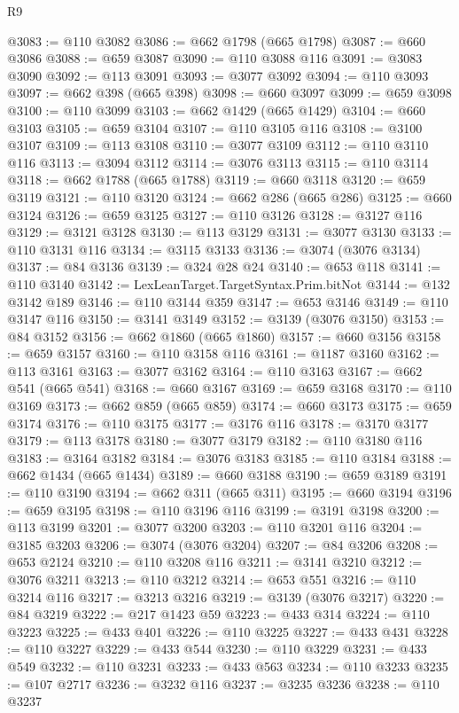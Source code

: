 \begin{lexlean}{R9}
\begin{coremodule}
@3083 := @110 @3082
@3086 := @662 @1798 (@665 @1798)
@3087 := @660 @3086
@3088 := @659 @3087
@3090 := @110 @3088 @116
@3091 := @3083 @3090
@3092 := @113 @3091
@3093 := @3077 @3092
@3094 := @110 @3093
@3097 := @662 @398 (@665 @398)
@3098 := @660 @3097
@3099 := @659 @3098
@3100 := @110 @3099
@3103 := @662 @1429 (@665 @1429)
@3104 := @660 @3103
@3105 := @659 @3104
@3107 := @110 @3105 @116
@3108 := @3100 @3107
@3109 := @113 @3108
@3110 := @3077 @3109
@3112 := @110 @3110 @116
@3113 := @3094 @3112
@3114 := @3076 @3113
@3115 := @110 @3114
@3118 := @662 @1788 (@665 @1788)
@3119 := @660 @3118
@3120 := @659 @3119
@3121 := @110 @3120
@3124 := @662 @286 (@665 @286)
@3125 := @660 @3124
@3126 := @659 @3125
@3127 := @110 @3126
@3128 := @3127 @116
@3129 := @3121 @3128
@3130 := @113 @3129
@3131 := @3077 @3130
@3133 := @110 @3131 @116
@3134 := @3115 @3133
@3136 := @3074 (@3076 @3134)
@3137 := @84 @3136
@3139 := @324 @28 @24
@3140 := @653 @118
@3141 := @110 @3140
@3142 := LexLeanTarget.TargetSyntax.Prim.bitNot
@3144 := @132 @3142 @189
@3146 := @110 @3144 @359
@3147 := @653 @3146
@3149 := @110 @3147 @116
@3150 := @3141 @3149
@3152 := @3139 (@3076 @3150)
@3153 := @84 @3152
@3156 := @662 @1860 (@665 @1860)
@3157 := @660 @3156
@3158 := @659 @3157
@3160 := @110 @3158 @116
@3161 := @1187 @3160
@3162 := @113 @3161
@3163 := @3077 @3162
@3164 := @110 @3163
@3167 := @662 @541 (@665 @541)
@3168 := @660 @3167
@3169 := @659 @3168
@3170 := @110 @3169
@3173 := @662 @859 (@665 @859)
@3174 := @660 @3173
@3175 := @659 @3174
@3176 := @110 @3175
@3177 := @3176 @116
@3178 := @3170 @3177
@3179 := @113 @3178
@3180 := @3077 @3179
@3182 := @110 @3180 @116
@3183 := @3164 @3182
@3184 := @3076 @3183
@3185 := @110 @3184
@3188 := @662 @1434 (@665 @1434)
@3189 := @660 @3188
@3190 := @659 @3189
@3191 := @110 @3190
@3194 := @662 @311 (@665 @311)
@3195 := @660 @3194
@3196 := @659 @3195
@3198 := @110 @3196 @116
@3199 := @3191 @3198
@3200 := @113 @3199
@3201 := @3077 @3200
@3203 := @110 @3201 @116
@3204 := @3185 @3203
@3206 := @3074 (@3076 @3204)
@3207 := @84 @3206
@3208 := @653 @2124
@3210 := @110 @3208 @116
@3211 := @3141 @3210
@3212 := @3076 @3211
@3213 := @110 @3212
@3214 := @653 @551
@3216 := @110 @3214 @116
@3217 := @3213 @3216
@3219 := @3139 (@3076 @3217)
@3220 := @84 @3219
@3222 := @217 @1423 @59
@3223 := @433 @314
@3224 := @110 @3223
@3225 := @433 @401
@3226 := @110 @3225
@3227 := @433 @431
@3228 := @110 @3227
@3229 := @433 @544
@3230 := @110 @3229
@3231 := @433 @549
@3232 := @110 @3231
@3233 := @433 @563
@3234 := @110 @3233
@3235 := @107 @2717
@3236 := @3232 @116
@3237 := @3235 @3236
@3238 := @110 @3237

\end{coremodule}
\end{lexlean}
